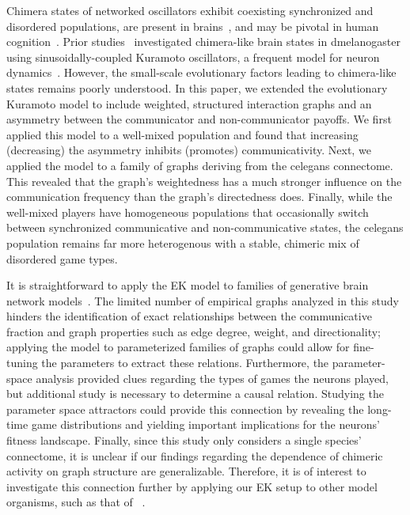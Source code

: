 \documentclass[pdflatex,lineno,referee,sn-nature]{sn-jnl}
\begin{document}
Chimera states of networked oscillators
exhibit coexisting
synchronized and disordered populations,
are present
in brains~\citep{santos2017chimera,bansal2019cognitive},
and may be pivotal in human cognition~\citep{bansal2019cognitive}.
Prior studies~\citep{deng2024chimera} investigated
chimera-like brain states in \gls{dmelanogaster}
using sinusoidally-coupled Kuramoto oscillators,
a frequent model for neuron dynamics~\citep{cabral2011role}.
However, the small-scale evolutionary factors
leading to chimera-like states remains poorly understood.
In this paper, we extended the evolutionary Kuramoto model
to include weighted, structured interaction graphs
and an asymmetry between
the communicator and non-communicator payoffs.
We first applied this model to a well-mixed population
and found that increasing (decreasing) the asymmetry
inhibits (promotes) communicativity.
Next, we applied the model to
a family of graphs deriving from the \gls{celegans} connectome.
This revealed that the graph's weightedness
has a much stronger influence on the communication frequency
than the graph's directedness does.
Finally, while the well-mixed players have homogeneous populations
that occasionally switch between synchronized communicative
and  non-communicative states,
the \gls{celegans} population remains far more heterogenous
with a stable, chimeric mix of disordered game types.

It is straightforward to apply the EK model
to families of generative brain network models~\citep{betzel2016generative}.
The limited number of empirical graphs analyzed in this study
hinders the identification of exact relationships
between the communicative fraction and graph properties
such as edge degree, weight, and directionality;
applying the model to parameterized families of graphs could allow
for fine-tuning the parameters to extract these relations.
Furthermore, the parameter-space analysis provided clues
regarding the types of games the neurons played,
but additional study is necessary to determine a causal relation.
Studying the parameter space attractors
could provide this connection
by revealing the long-time game distributions
and yielding important implications for the neurons' fitness landscape.
Finally, since this study only considers a single species' connectome,
it is unclear if our findings regarding the dependence
of chimeric activity on graph structure are generalizable.
Therefore, it is of interest to investigate this connection further
by applying our EK setup to other model organisms,
such as that of
~\citep{schlegel2024whole}.
\end{document}

